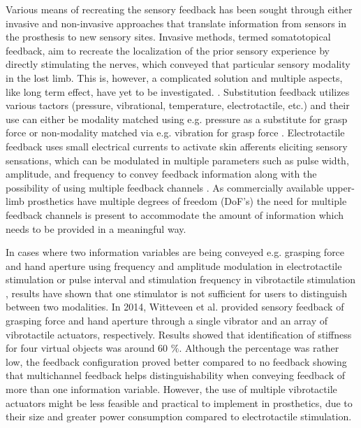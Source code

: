 %
Various means of recreating the sensory feedback has been sought through either invasive and non-invasive approaches that translate information from sensors in the prosthesis to new sensory sites. Invasive methods, termed somatotopical feedback, aim to recreate the localization of the prior sensory experience by directly stimulating the nerves, which conveyed that particular sensory modality in the lost limb. This is, however, a complicated solution and multiple aspects, like long term effect, have yet to be investigated. \cite{Schofield2014,Stephens-Fripp2018}. 
Substitution feedback utilizes various tactors (pressure, vibrational, temperature, electrotactile, etc.) and their use can either be modality matched using e.g. pressure as a substitute for grasp force \cite{Godfrey2017} or non-modality matched via e.g. vibration for grasp force \cite{Ninu2014,Nabeel2016}. 
Electrotactile feedback uses small electrical currents to activate skin afferents eliciting sensory sensations, which can be modulated in multiple parameters such as pulse width, amplitude, and frequency to convey feedback information along with the possibility of using multiple feedback channels \cite{Geng2012}. As commercially available upper-limb prosthetics have multiple degrees of freedom (DoF's) \cite{Cordella2016} the need for multiple feedback channels is present to accommodate the amount of information which needs to be provided in a meaningful way. 

%
In cases where two information variables are being conveyed e.g. grasping force and hand aperture using frequency and amplitude modulation in electrotactile stimulation \cite{Prior1976} or pulse interval and stimulation frequency in vibrotactile stimulation \cite{Chatterjee2008}, results have shown that one stimulator is not sufficient for users to distinguish between two modalities. In 2014, Witteveen et al. \cite{Witteveen2014} provided sensory feedback of grasping force and hand aperture through a single vibrator and an array of vibrotactile actuators, respectively. Results showed that identification of stiffness for four virtual objects was around 60 $\%$. Although the percentage was rather low, the feedback configuration proved better compared to no feedback showing that multichannel feedback helps distinguishability when conveying feedback of more than one information variable. \cite{Witteveen2014} However, the use of multiple vibrotactile actuators might be less feasible and practical to implement in prosthetics, due to their size and greater power consumption compared to electrotactile stimulation.  

